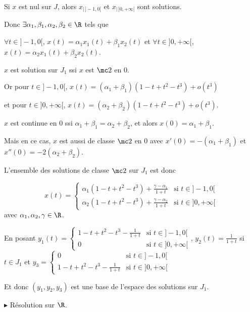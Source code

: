 \begin{exemple}
    Si $x$ est nul sur $J$, alors $x_{|\,]-1, 0[}$ et $x_{|\,]0, +\infty[}$ sont solutions. 

    Donc $\exists \alpha_1, \beta_1, \alpha_2, \beta_2 \in \R$ tels que

    $\forall t \in ]-1, 0[$, $x(t) = \alpha_1 x_1(t) + \beta_1 x_2(t)$ et
    $\forall t \in ]0, +\infty[$, $x(t) = \alpha_2 x_1(t) + \beta_2 x_2(t)$.

    $x$ est solution sur $J_1$ ssi $x$ est $\mc 2$ en $0$.

    Or pour $t \in ] -1, 0[$, $x(t) = (\alpha_1 + \beta_1)(1 - t + t^2 - t^3) + o(t^3)$ 

    et pour $t \in ]0, +\infty[$, $x(t) = (\alpha_2 + \beta_2)(1 - t + t^2 - t^3) + o(t^3)$.

    $x$ est continue en $0$ ssi $\alpha_1 + \beta_1 = \alpha_2 + \beta_2$, et alors 
    $x(0) = \alpha_1 + \beta_1$.

    Mais en ce cas, $x$ est aussi de classe $\mc 2$ en $0$ avec $x'(0) = -(\alpha_1 + \beta_1)$ et \\
    $x''(0) = -2(\alpha_2 + \beta_2)$.

    L'ensemble des solutions de classe $\mc 2$ sur $J_1$ est donc

    $$x(t) = \begin{cases}
        \alpha_1 (1 - t + t^2 - t^3) + \frac{\gamma - \alpha_1} {1 + t} & \text{si } t \in ]-1, 0[ \\
        \alpha_2 (1 - t + t^2 - t^3) + \frac{\gamma - \alpha_2} {1 + t} & \text{si } t \in ]0, +\infty[
    \end{cases}$$ avec 
    $\alpha_1, \alpha_2, \gamma \in \R$.

    En posant $y_1(t) = \begin{cases}
        1 - t + t^2 - t^3 - \frac 1 {1 + t} & \text{si } t \in ]-1, 0[ \\
        0 & \text{si } t \in ]0, +\infty[
    \end{cases}$, $y_2(t) = \frac 1 {1 + t}$ si $t \in J_1$ et 
    $y_3 = \begin{cases}
        0 & \text{si } t \in ]-1, 0[ \\
        1 - t + t^2 - t^3 - \frac 1 {1 + t} & \text{si } t \in ]0, +\infty[
    \end{cases}$

    Et donc $(y_1, y_2, y_3)$ est une base de l'espace des solutions sur 
    $J_1$.

    \lvspace $\blacktriangleright$ Résolution sur $\R$. 


\end{exemple}
